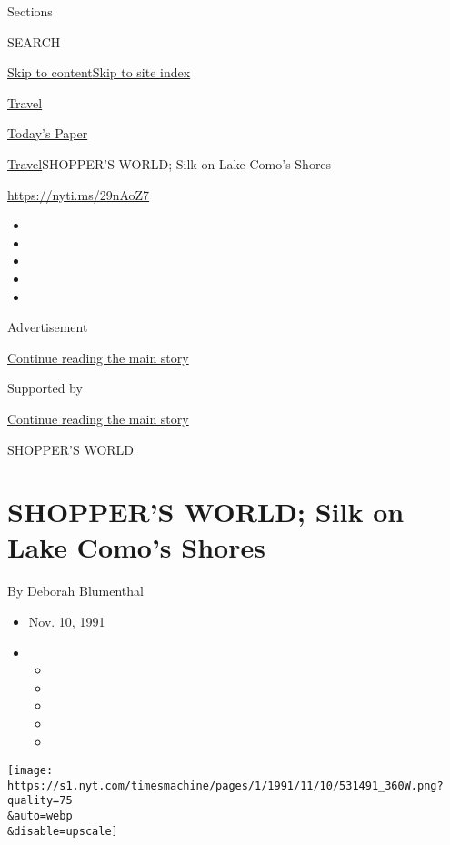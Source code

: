 Sections

SEARCH

\protect\hyperlink{site-content}{Skip to
content}\protect\hyperlink{site-index}{Skip to site index}

\href{https://www.nytimes.com/section/travel}{Travel}

\href{https://myaccount.nytimes.com/auth/login?response_type=cookie\&client_id=vi}{}

\href{https://www.nytimes.com/section/todayspaper}{Today's Paper}

\href{/section/travel}{Travel}\textbar{}SHOPPER'S WORLD; Silk on Lake
Como's Shores

\href{https://nyti.ms/29nAoZ7}{https://nyti.ms/29nAoZ7}

\begin{itemize}
\item
\item
\item
\item
\item
\end{itemize}

Advertisement

\protect\hyperlink{after-top}{Continue reading the main story}

Supported by

\protect\hyperlink{after-sponsor}{Continue reading the main story}

SHOPPER'S WORLD

\hypertarget{shoppers-world-silk-on-lake-comos-shores}{%
\section{SHOPPER'S WORLD; Silk on Lake Como's
Shores}\label{shoppers-world-silk-on-lake-comos-shores}}

By Deborah Blumenthal

\begin{itemize}
\item
  Nov. 10, 1991
\item
  \begin{itemize}
  \item
  \item
  \item
  \item
  \item
  \end{itemize}
\end{itemize}

\texttt{[image: https://s1.nyt.com/timesmachine/pages/1/1991/11/10/531491\_360W.png?quality=75\\\&auto=webp\\\&disable=upscale]}

